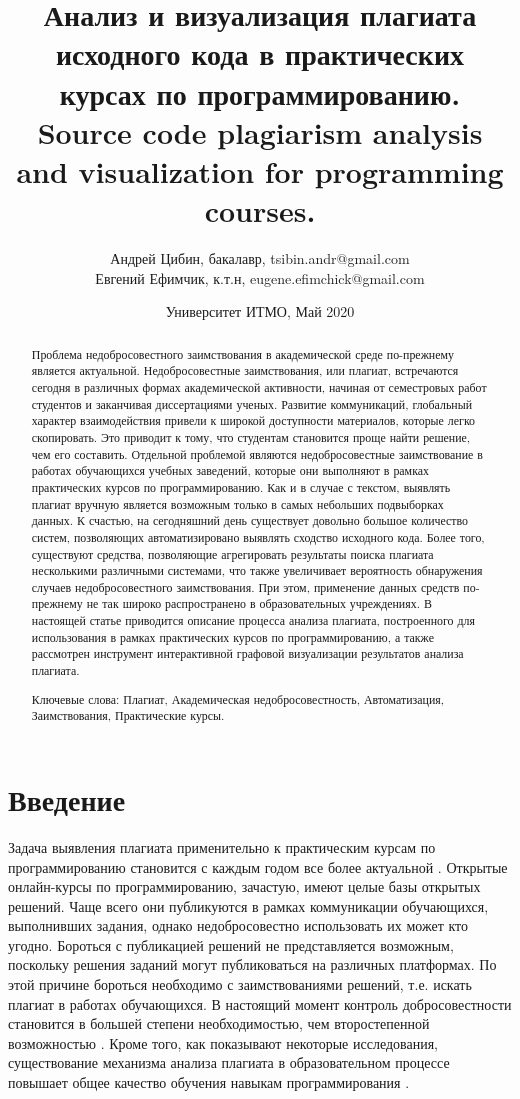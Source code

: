 \documentclass[a4paper,14pt]{extarticle}
\title{Анализ и визуализация плагиата исходного кода в практических курсах по программированию. Source code plagiarism analysis and visualization for programming courses.}
\author{Андрей Цибин, бакалавр, tsibin.andr@gmail.com\\Евгений Ефимчик, к.т.н, eugene.efimchick@gmail.com}
\date{Университет ИТМО, Май 2020}
\begin{document}
\maketitle

\begin{abstract}

Проблема недобросовестного заимствования в академической среде по-прежнему
является актуальной. Недобросовестные заимствования, или плагиат, встречаются сегодня в различных формах академической активности, начиная от семестровых работ студентов и заканчивая диссертациями ученых. Развитие коммуникаций, глобальный характер взаимодействия привели к широкой доступности материалов, которые легко скопировать. Это приводит к тому, что студентам становится проще найти решение, чем его составить. Отдельной проблемой
являются недобросовестные заимствование в работах обучающихся учебных заведений, которые они выполняют в рамках практических курсов по программированию. Как и в случае с текстом, выявлять плагиат вручную является возможным только в самых небольших подвыборках данных. К счастью, на сегодняшний день существует довольно большое количество систем, позволяющих
автоматизировано выявлять сходство исходного кода. Более того, существуют
средства, позволяющие агрегировать результаты поиска плагиата несколькими
различными системами, что также увеличивает вероятность обнаружения случаев недобросовестного заимствования. При этом, применение данных средств
по-прежнему не так широко распространено в образовательных учреждениях.
В настоящей статье приводится описание процесса анализа плагиата, построенного для использования в рамках практических курсов по программированию, а также рассмотрен инструмент интерактивной графовой визуализации результатов анализа плагиата.

Ключевые слова: Плагиат, Академическая недобросовестность, Автоматизация, Заимствования, Практические курсы.

\end{abstract}

\section{Введение}

Задача выявления плагиата применительно к практическим курсам по программированию становится с каждым годом все более актуальной \citep{plagiarismEpidemic}. Открытые онлайн-курсы по программированию, зачастую, имеют целые базы открытых решений. Чаще всего они публикуются в рамках коммуникации обучающихся,  выполнивших задания, однако недобросовестно использовать их может кто угодно. Бороться с публикацией решений не представляется возможным, поскольку решения заданий могут публиковаться на различных платформах. По этой причине бороться необходимо с заимствованиями решений, т.е. искать плагиат в работах обучающихся. В настоящий момент контроль добросовестности становится в большей степени необходимостью, чем второстепенной возможностью \citep{sciencePlagiarismPaper}. Кроме того, как показывают некоторые исследования, существование механизма анализа плагиата в образовательном процессе повышает общее качество обучения навыкам программирования \citep{plagCheckEffect}\citep{plagInterventionEffect}.
\end{document}
